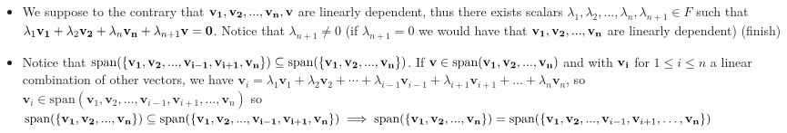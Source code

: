 \documentclass{report}
\begin{document}
\begin{myproof}
    \begin{itemize}
        \item We suppose to the contrary that $\bold{v_1}, \bold{v_2}, ..., \bold{v_n}, \bold{v}$ are linearly dependent, thus there exists scalars $\lambda _1, \lambda _2, ..., \lambda _n, \lambda _{n+1} \in F $ such that $\lambda _1\bold{v_1} + \lambda _2\bold{v_2} + \lambda _n\bold{v_n} + \lambda _{n+1}\bold{v} = \bold{0}$. Notice that $\lambda _{n+1} \ne 0$ (if $\lambda _{n+1} = 0$ we would have that $\bold{v_1}, \bold{v_2}, ..., \bold{v_n}$ are linearly dependent) (finish)
        \item Notice that $\text{span}(\{\bold{v_1}, \bold{v_2}, ..., \bold{v_{i-1}}, \bold{v_{i+1}}, \bold{v_n}\}) \subseteq \text{span}(\{\bold{v_1}, \bold{v_2}, ..., \bold{v_n}\}) $. If $\bold{v} \in \text{span}(\bold{v_1}, \bold{v_2}, ...,  \bold{v_n})$ and with $\bold{v_i}$ for $1\le i \le n$ a linear combination of other vectors, we have $ \mathbf{v}_i = \lambda_1 \mathbf{v}_1 + \lambda _2 \mathbf{v}_2 + \cdots + \lambda_{i-1} \mathbf{v}_{i-1} + \lambda_{i+1} \mathbf{v}_{i+1} + \ldots +  \lambda_{n}\mathbf{v}_{n}$, so $\mathbf{v}_i \in \mathrm{span}\left( \mathbf{v}_1, \mathbf{v}_2, \ldots, \mathbf{v}_{i-1}, \mathbf{v}_{i+1}, \ldots, \mathbf{v}_n \right) $ so $\text{span}(\{\bold{v_1}, \bold{v_2}, ..., \bold{v_n}\}) \subseteq \text{span}(\{\bold{v_1}, \bold{v_2}, ..., \bold{v_{i-1}}, \bold{v_{i+1}}, \bold{v_n}\}) \implies  \text{span}(\{\bold{v_1}, \bold{v_2}, ..., \bold{v_n}\}) =  \text{span}(\{\bold{v_1}, \bold{v_2}, ..., \mathbf{v}_{i-1},\mathbf{v}_{i+1}, \ldots, \bold{v_n}\}) $ 
    \end{itemize}
\end{myproof}

\end{document}
